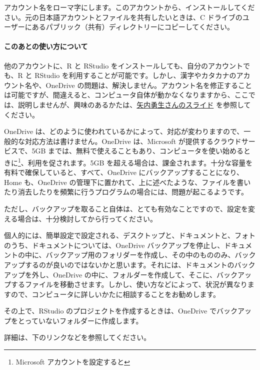 \documentclass[
  xelatex, ja=standard]{bxjsbook}
\theoremstyle{definition}
\theoremstyle{definition}
\theoremstyle{definition}
\theoremstyle{definition}
\theoremstyle{remark}
\begin{document}
アカウント名をローマ字にします。このアカウントから、インストールしてください。元の日本語アカウントとファイルを共有したいときは、C ドライブのユーザーにあるパブリック（共有）ディレクトリーにコピーしてください。

\hypertarget{ux3053ux306eux3042ux3068ux306eux4f7fux3044ux65b9ux306bux3064ux3044ux3066}{%
\paragraph{このあとの使い方について}\label{ux3053ux306eux3042ux3068ux306eux4f7fux3044ux65b9ux306bux3064ux3044ux3066}}

他のアカウントに、R と RStudio をインストールしても、自分のアカウントでも、R と RStudio を利用することが可能です。しかし、漢字やカタカナのアカウント名や、OneDrive の問題は、解決しません。アカウント名を修正することは可能ですが、間違えると、コンピュータ自体が動かなくなりますから、ここでは、説明しませんが、興味のあるかたは、\href{https://yukiyanai.github.io/jp/resources/docs/install-R_windows.pdf}{矢内勇生さんのスライド} を参照してください。

OneDrive は、どのように使われているかによって、対応が変わりますので、一般的な対応方法は書けません。OneDrive は、Microsoft が提供するクラウドサービスで、5GB までは、無料で使えることもあり、コンピュータを使い始めるときに\footnote{Microsoft アカウントを設定すると}、利用を促されます。5GB を超える場合は、課金されます。十分な容量を有料で確保していると、すべて、OneDrive にバックアップすることになり、Home も、OneDrive の管理下に置かれて、上に述べたような、ファイルを書いたり消去したりを頻繁に行うプログラムの場合には、問題が起こるようです。

ただし、バックアップを取ること自体は、とても有効なことですので、設定を変える場合は、十分検討してから行ってください。

個人的には、簡単設定で設定される、デスクトップと、ドキュメントと、フォトのうち、ドキュメントについては、OneDrive バックアップを停止し、ドキュメントの中に、バックアップ用のフォリダーを作成し、その中のもののみ、バックアップするのが良いのではないかと思います。それには、ドキュメントのバックアップを外し、OneDrive の中に、フォルダーを作成して、そこに、バックアップするファイルを移動させます。しかし、使い方などによって、状況が異なりますので、コンピュータに詳しいかたに相談することをお勧めします。

その上で、RStudio のプロジェクトを作成するときは、OneDrive でバックアップをとっていないフォルダーに作成します。

詳細は、下のリンクなどを参照してください。
\end{document}
